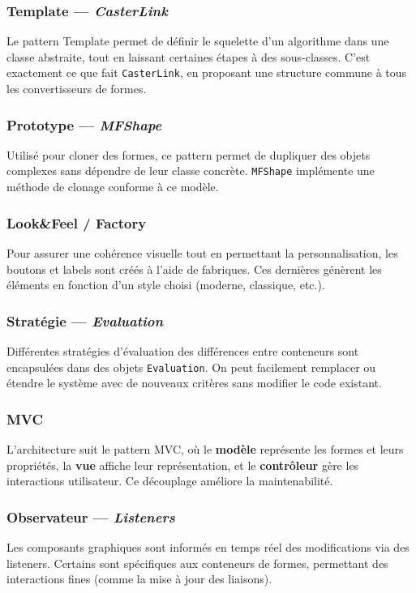\documentclass[11pt]{article}
\begin{document}
\subsubsection{Template — \textit{CasterLink}}
Le pattern Template permet de définir le squelette d'un algorithme dans une classe abstraite, tout en laissant certaines étapes à des sous-classes. C’est exactement ce que fait \texttt{CasterLink}, en proposant une structure commune à tous les convertisseurs de formes.

\subsubsection{Prototype — \textit{MFShape}}
Utilisé pour cloner des formes, ce pattern permet de dupliquer des objets complexes sans dépendre de leur classe concrète. \texttt{MFShape} implémente une méthode de clonage conforme à ce modèle.

\subsubsection{Look\&Feel / Factory}
Pour assurer une cohérence visuelle tout en permettant la personnalisation, les boutons et labels sont créés à l’aide de fabriques. Ces dernières génèrent les éléments en fonction d’un style choisi (moderne, classique, etc.).

\subsubsection{Stratégie — \textit{Evaluation}}
Différentes stratégies d’évaluation des différences entre conteneurs sont encapsulées dans des objets \texttt{Evaluation}. On peut facilement remplacer ou étendre le système avec de nouveaux critères sans modifier le code existant.

\subsubsection{MVC}
L'architecture suit le pattern MVC, où le \textbf{modèle} représente les formes et leurs propriétés, la \textbf{vue} affiche leur représentation, et le \textbf{contrôleur} gère les interactions utilisateur. Ce découplage améliore la maintenabilité.

\subsubsection{Observateur — \textit{Listeners}}
Les composants graphiques sont informés en temps réel des modifications via des listeners. Certains sont spécifiques aux conteneurs de formes, permettant des interactions fines (comme la mise à jour des liaisons).
\end{document}
